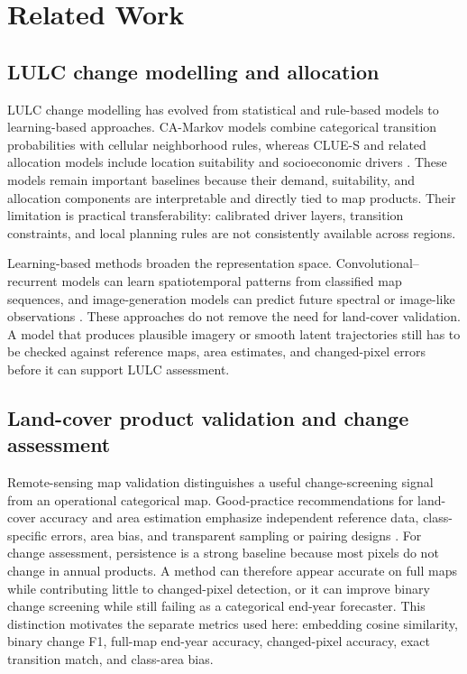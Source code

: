 \documentclass{article}
\begin{document}
\section{Related Work}
\label{sec:related}

\subsection{LULC change modelling and allocation}

LULC change modelling has evolved from statistical and rule-based models to learning-based approaches. CA-Markov models combine categorical transition probabilities with cellular neighborhood rules, whereas CLUE-S and related allocation models include location suitability and socioeconomic drivers \citep{veldkamp2004clues,verburg2002clues}. These models remain important baselines because their demand, suitability, and allocation components are interpretable and directly tied to map products. Their limitation is practical transferability: calibrated driver layers, transition constraints, and local planning rules are not consistently available across regions.

Learning-based methods broaden the representation space. Convolutional--recurrent models can learn spatiotemporal patterns from classified map sequences, and image-generation models can predict future spectral or image-like observations \citep{shi2015convlstm,smith2023earthpt,khanna2023diffusionsat}. These approaches do not remove the need for land-cover validation. A model that produces plausible imagery or smooth latent trajectories still has to be checked against reference maps, area estimates, and changed-pixel errors before it can support LULC assessment.

\subsection{Land-cover product validation and change assessment}

Remote-sensing map validation distinguishes a useful change-screening signal from an operational categorical map. Good-practice recommendations for land-cover accuracy and area estimation emphasize independent reference data, class-specific errors, area bias, and transparent sampling or pairing designs \citep{ceoslpv2026,olofsson2014good,stehman2019key}. For change assessment, persistence is a strong baseline because most pixels do not change in annual products. A method can therefore appear accurate on full maps while contributing little to changed-pixel detection, or it can improve binary change screening while still failing as a categorical end-year forecaster. This distinction motivates the separate metrics used here: embedding cosine similarity, binary change F1, full-map end-year accuracy, changed-pixel accuracy, exact transition match, and class-area bias.
\end{document}
